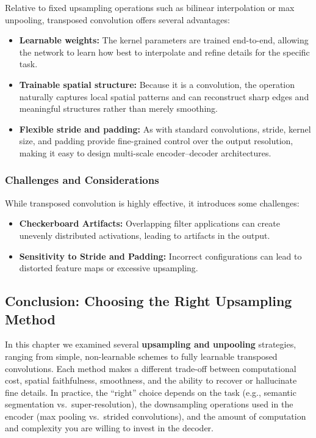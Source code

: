 \noindent
Relative to fixed upsampling operations such as bilinear interpolation or max unpooling, transposed convolution offers several advantages:
\begin{itemize}
	\item \textbf{Learnable weights:} The kernel parameters are trained end-to-end, allowing the network to learn how best to interpolate and refine details for the specific task.
	\item \textbf{Trainable spatial structure:} Because it is a convolution, the operation naturally captures local spatial patterns and can reconstruct sharp edges and meaningful structures rather than merely smoothing.
	\item \textbf{Flexible stride and padding:} As with standard convolutions, stride, kernel size, and padding provide fine-grained control over the output resolution, making it easy to design multi-scale encoder–decoder architectures.
\end{itemize}

\subsubsection{Challenges and Considerations}

\noindent While transposed convolution is highly effective, it introduces some challenges:

\begin{itemize}
	\item \textbf{Checkerboard Artifacts:} Overlapping filter applications can create unevenly distributed activations, leading to artifacts in the output.
	\item \textbf{Sensitivity to Stride and Padding:} Incorrect configurations can lead to distorted feature maps or excessive upsampling.
	
\end{itemize}

\subsection{Conclusion: Choosing the Right Upsampling Method}
\label{subsec:chapter15_upsampling_conclusion}

\noindent
In this chapter we examined several \textbf{upsampling and unpooling} strategies, ranging from simple, non-learnable schemes to fully learnable transposed convolutions. Each method makes a different trade-off between computational cost, spatial faithfulness, smoothness, and the ability to recover or hallucinate fine details. In practice, the “right” choice depends on the task (e.g., semantic segmentation vs.\ super-resolution), the downsampling operations used in the encoder (max pooling vs.\ strided convolutions), and the amount of computation and complexity you are willing to invest in the decoder.

